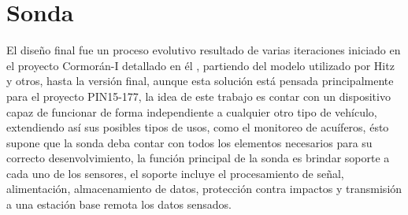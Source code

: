 \section{Sonda}
El dise\~no final fue un proceso evolutivo resultado de varias iteraciones iniciado en el proyecto Cormor\'an-I detallado en \'el 
, partiendo del modelo utilizado por Hitz y otros,\cite{hitz2012design}
hasta la versi\'on final, aunque esta soluci\'on est\'a pensada principalmente para el proyecto PIN15-177, la idea de este trabajo es contar con un dispositivo capaz de funcionar de forma independiente a cualquier otro tipo de veh\'iculo, extendiendo as\'i sus posibles tipos de usos, como el monitoreo de acu\'iferos, ésto supone que la sonda deba contar con todos los elementos necesarios para su correcto desenvolvimiento, la funci\'on principal de la sonda es brindar soporte a cada uno de los sensores, el soporte incluye el procesamiento de se\~nal, alimentaci\'on, almacenamiento de datos, protecci\'on contra impactos y transmisi\'on a una estaci\'on base remota los datos sensados.
